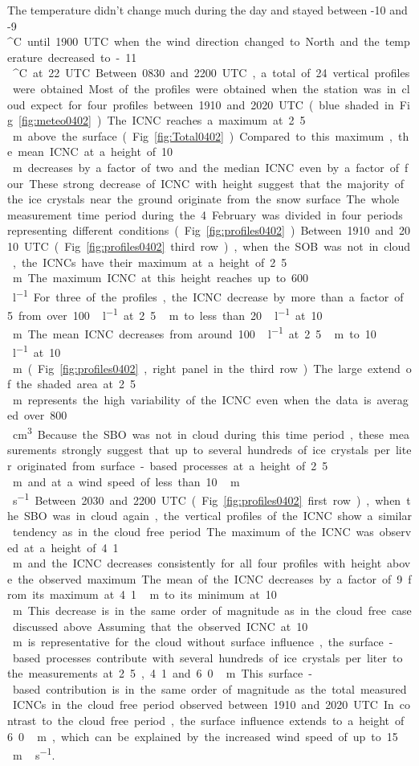 \documentclass[draft,linenumbers]{agujournal}
\begin{document}
The temperature didn't change much during the day and stayed between -10 and -9\,\si{^\circ C} until 1900 UTC when the wind direction changed to North and the temperature decreased to -11\,\si{^\circ C} at 22 UTC.

Between 0830 and 2200 UTC, a total of 24 vertical profiles were obtained. Most of the profiles were obtained when the station was in cloud expect for four profiles between 1910 and 2020 UTC (blue shaded in Fig. \ref{fig:meteo0402}). The ICNC reaches a maximum at 2.5\,\si{m} above the surface (Fig. \ref{fig:Total0402}). Compared to this maximum, the mean ICNC at a height of 10\,\si{m} decreases by a factor of two and the median ICNC even by a factor of four. These strong decrease of ICNC with height suggest that the majority of the ice crystals near the ground originate from the snow surface.

The whole measurement time period during the 4 February was divided in four periods representing different conditions (Fig. \ref{fig:profiles0402}). Between 1910 and 2010 UTC (Fig. \ref{fig:profiles0402} third row), when the SOB was not in cloud, the ICNCs have their maximum at a height of 2.5\,\si{m}. The maximum ICNC at this height reaches up to 600\,\si{l^{-1}}. For three of the profiles, the ICNC decrease by more than a factor of 5 from over 100\,\si{l^{-1}} at 2.5\,\si{m} to less than 20\,\si{l^{-1}} at 10\,\si{m}. The mean ICNC decreases from around 100\,\si{l^{-1}} at 2.5\,\si{m} to 10\,\si{l^{-1}} at 10\,\si{m} (Fig. \ref{fig:profiles0402}, right panel in the third row). The large extend of the shaded area at 2.5\,\si{m} represents the high variability of the ICNC even when the data is averaged over 800\,\si{cm^3}. Because the SBO was not in cloud during this time period, these measurements strongly suggest that up to several hundreds of ice crystals per liter originated from surface-based processes at a height of 2.5\,\si{m} and at a wind speed of less than 10\,\si{m\,s^{-1}}.

Between 2030 and 2200 UTC (Fig. \ref{fig:profiles0402} first row), when the SBO was in cloud again, the vertical profiles of the ICNC show a similar tendency as in the cloud free period. The maximum of the ICNC was observed at a height of 4.1\,\si{m} and the ICNC decreases consistently for all four profiles with height above the observed maximum. The mean of the ICNC decreases by a factor of 9 from its maximum at 4.1\,\si{m} to its minimum at 10\,\si{m}. This decrease is in the same order of magnitude as in the cloud free case discussed above. Assuming that the observed ICNC at 10\,\si{m} is representative for the cloud without surface influence, the surface-based processes contribute with several hundreds of ice crystals per liter to the measurements at 2.5, 4.1 and 6.0\,\si{m}. This surface-based contribution is in the same order of magnitude as the total measured ICNCs in the cloud free period observed between 1910 and 2020 UTC. In contrast to the cloud free period, the surface influence extends to a height of 6.0\,\si{m}, which can be explained by the increased wind speed of up to 15\,\si{m\,s^{-1}}. 
\end{document}
